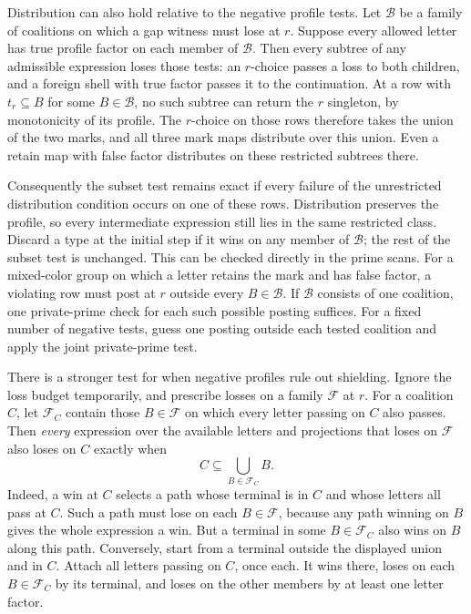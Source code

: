 Distribution can also hold relative to the negative
profile tests. Let $\mathcal B$ be a family of
coalitions on which a gap witness must lose at $r$.
Suppose every allowed letter has true profile factor
on each member of $\mathcal B$. Then every subtree of
any admissible expression loses those tests: an
$r$-choice passes a loss to both children, and a
foreign shell with true factor passes it to the
continuation. At a row with $t_r\subseteq B$ for
some $B\in\mathcal B$, no such subtree can return
the $r$ singleton, by monotonicity of its profile.
The $r$-choice on those rows therefore takes the
union of the two marks, and all three mark maps
distribute over this union. Even a retain map with
false factor distributes on these restricted
subtrees there.

Consequently the subset test remains exact if every
failure of the unrestricted distribution condition
occurs on one of these rows. Distribution preserves
the profile, so every intermediate expression still
lies in the same restricted class. Discard a type
at the initial step if it wins on any member of
$\mathcal B$; the rest of the subset test is unchanged.
This can be checked directly in the prime scans.
For a mixed-color group on which a letter retains
the mark and has false factor, a violating row
must post at $r$ outside every $B\in\mathcal B$.
If $\mathcal B$ consists of one coalition, one
private-prime check for each such possible posting
suffices. For a fixed number of negative tests,
guess one posting outside each tested coalition
and apply the joint private-prime test.

There is a stronger test for when negative profiles
rule out shielding. Ignore the loss budget temporarily,
and prescribe losses on a family $\mathcal F$ at $r$.
For a coalition $C$, let $\mathcal F_C$ contain those
$B\in\mathcal F$ on which every letter passing on $C$
also passes. Then \emph{every} expression over the
available letters and projections that loses on
$\mathcal F$ also loses on $C$ exactly when
\[
                       C\subseteq\bigcup_{B\in\mathcal F_C}B.
\]
Indeed, a win at $C$ selects a path whose terminal is
in $C$ and whose letters all pass at $C$. Such a path
must lose on each $B\in\mathcal F$, because any path
winning on $B$ gives the whole expression a win.
But a terminal in some $B\in\mathcal F_C$ also wins
on $B$ along this path. Conversely, start from a
terminal outside the displayed union and in $C$.
Attach all letters passing on $C$, once each. It
wins there, loses on each $B\in\mathcal F_C$ by
its terminal, and loses on the other members by
at least one letter factor.

